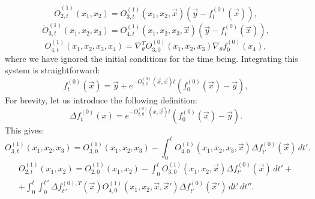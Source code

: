 \documentclass{article}
\begin{document}
    \begin{equation}
        \dot O_{2,t}^{(1)}(x_1, x_2) = 
        O_{3,t}^{(1)}(x_1, x_2, \vec x) (\vec y - f_t^{(0)}(\vec x)),
    \end{equation}
    \begin{equation}
        \dot O_{3,t}^{(1)}(x_1, x_2, x_3) = 
        O_{4,t}^{(1)}(x_1, x_2, x_3, \vec x) (\vec y - f_t^{(0)}(\vec x)),
    \end{equation}
    \begin{equation}
        O_{4,t}^{(1)}(x_1, x_2, x_3, x_4) =
        \nabla_\theta^T O_{3,0}^{(0)}(x_1, x_2, x_3) \nabla_\theta f_0^{(0)}(x_4),
    \end{equation}
    where we have ignored the initial conditions for the time being.
    Integrating this system is straightforward:
    \begin{equation}
        f_{t}^{(0)}(\vec x) =
        \vec y + e^{-O_{2,0}^{(0)}(\vec x, \vec x) t} (f_0^{(0)}(\vec x) - \vec y),
    \end{equation}
    For brevity, let us introduce the following definition:
    \begin{equation}
        \Delta f_t^{(0)}(x) =
        e^{-O_{2,0}^{(0)}(x, \vec x) t} (f_0^{(0)}(\vec x) - \vec y).
    \end{equation}
    This gives:
    \begin{equation}
        O_{3,t}^{(1)}(x_1, x_2, x_3) = 
        O_{3,0}^{(1)}(x_1, x_2, x_3) - 
        \int_{0}^t O_{4,0}^{(1)}(x_1, x_2, x_3, \vec x) \Delta f_{t'}^{(0)}(\vec x) \, dt'.
    \end{equation}
    \begin{multline}
        O_{2,t}^{(1)}(x_1, x_2)
        = O_{2,0}^{(1)}(x_1, x_2) - \int_{0}^t O_{3,0}^{(1)}(x_1, x_2, \vec x) \Delta f_{t'}^{(0)}(\vec x) \, dt'
        +\\+
        \int_{0}^{t} \int_{0}^{t''} \Delta f_{t''}^{(0),T}(\vec x) O_{4,0}^{(1)}(x_1, x_2, \vec x, \vec x') \Delta f_{t'}^{(0)}(\vec x') \, dt' \, dt''.
    \end{multline}
\end{document}
